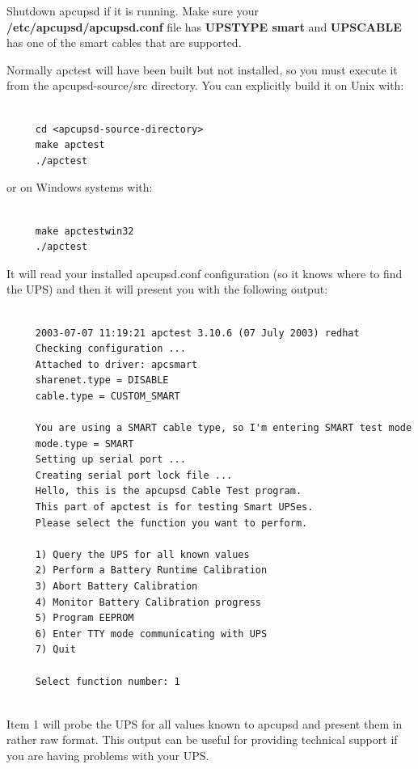 {{{{Shutdown apcupsd if it is running. Make sure your {\bf
/etc/apcupsd/apcupsd.conf} file has {\bf UPSTYPE smart} and {\bf UPSCABLE} has
one of the smart cables that are supported.  

Normally apctest will have been built but not installed, so you must execute
it from the \lt{}apcupsd-source\gt{}/src directory. You can explicitly build
it on Unix with: 

\footnotesize
\begin{verbatim}
     
     cd <apcupsd-source-directory>
     make apctest
     ./apctest
\end{verbatim}
\normalsize

or on Windows systems with: 

\footnotesize
\begin{verbatim}
     
     make apctestwin32
     ./apctest
\end{verbatim}
\normalsize

It will read your installed apcupsd.conf configuration (so it knows where to
find the UPS) and then it will present you with the following output: 

\footnotesize
\begin{verbatim}
     
     2003-07-07 11:19:21 apctest 3.10.6 (07 July 2003) redhat
     Checking configuration ...
     Attached to driver: apcsmart
     sharenet.type = DISABLE
     cable.type = CUSTOM_SMART
     
     You are using a SMART cable type, so I'm entering SMART test mode
     mode.type = SMART
     Setting up serial port ...
     Creating serial port lock file ...
     Hello, this is the apcupsd Cable Test program.
     This part of apctest is for testing Smart UPSes.
     Please select the function you want to perform.
     
     1) Query the UPS for all known values
     2) Perform a Battery Runtime Calibration
     3) Abort Battery Calibration
     4) Monitor Battery Calibration progress
     5) Program EEPROM
     6) Enter TTY mode communicating with UPS
     7) Quit
     
     Select function number: 1
     
\end{verbatim}
\normalsize

Item 1 will probe the UPS for all values known to apcupsd and present them in
rather raw format. This output can be useful for providing technical support
if you are having problems with your UPS.  

}}}}
